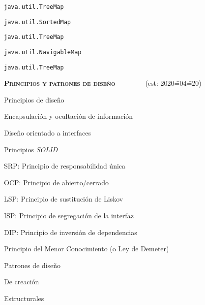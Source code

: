 \begin{longenum}
\begin{longenum}
\begin{longenum}
\begin{longenum}
                \item \texttt{java.util.TreeMap}
            \end{longenum}
            \item \texttt{java.util.SortedMap}
            \begin{longenum}
                \item \texttt{java.util.TreeMap}
            \end{longenum}
            \item \texttt{java.util.NavigableMap}
            \begin{longenum}
                \item \texttt{java.util.TreeMap}
            \end{longenum}
        \end{longenum}
    \end{longenum}
    \item \textbf{\textsc{Principios y patrones de diseño}} \ \ \ \ \ \ \ \ (est: 2020\==04\==20)
    \begin{longenum}
        \item Principios de diseño
        \begin{longenum}
            \item Encapsulación y ocultación de información
            \item Diseño orientado a interfaces
            \item Principios \textit{SOLID}
            \begin{longenum}
                \item SRP: Principio de responsabilidad única
                \item OCP: Principio de abierto/cerrado
                \item LSP: Principio de sustitución de Liskov
                \item ISP: Principio de segregación de la interfaz
                \item DIP: Principio de inversión de dependencias
            \end{longenum}
            \item Principio del Menor Conocimiento (o Ley de Demeter)
        \end{longenum}
        \item Patrones de diseño
        \begin{longenum}
            \item De creación
            \item Estructurales

\end{longenum}
\end{longenum}
\end{longenum}
